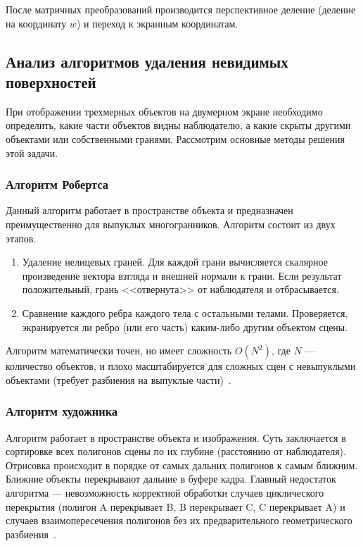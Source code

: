 После матричных преобразований производится перспективное деление (деление на координату $w$) и переход к экранным координатам.

\subsection[Анализ алгоритмов удаления невидимых поверхностей]{Анализ алгоритмов удаления невидимых \\ поверхностей}

При отображении трехмерных объектов на двумерном экране необходимо определить, какие части объектов видны наблюдателю, а какие скрыты другими объектами или собственными гранями. Рассмотрим основные методы решения этой задачи.

\subsubsection{Алгоритм Робертса}
Данный алгоритм работает в пространстве объекта и предназначен преимущественно для выпуклых многогранников. Алгоритм состоит из двух этапов.
\begin{enumerate}
	\item Удаление нелицевых граней. Для каждой грани вычисляется скалярное произведение вектора взгляда и внешней нормали к грани. Если результат положительный, грань <<отвернута>> от наблюдателя и отбрасывается.
	\item Сравнение каждого ребра каждого тела с остальными телами. Проверяется, экранируется ли ребро (или его часть) каким-либо другим объектом сцены.
\end{enumerate}
Алгоритм математически точен, но имеет сложность $O(N^2)$, где $N$ --- количество объектов, и плохо масштабируется для сложных сцен с невыпуклыми объектами (требует разбиения на выпуклые части)~\cite{rogers1989}.

\subsubsection{Алгоритм художника}
Алгоритм работает в пространстве объекта и изображения. Суть заключается в сортировке всех полигонов сцены по их глубине (расстоянию от наблюдателя). Отрисовка происходит в порядке от самых дальних полигонов к самым ближним. Ближние объекты перекрывают дальние в буфере кадра.
Главный недостаток алгоритма --- невозможность корректной обработки случаев циклического перекрытия (полигон A перекрывает B, B перекрывает C, C перекрывает A) и случаев взаимопересечения полигонов без их предварительного геометрического разбиения~\cite{rogers1989}.

